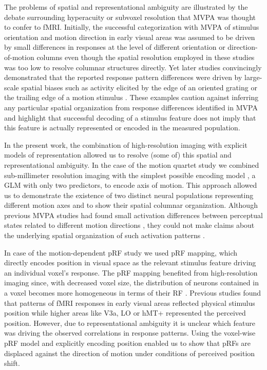 The problems of spatial and representational ambiguity are illustrated by the debate surrounding hyperacuity or subvoxel resolution that MVPA was thought to confer to fMRI. Initially, the successful categorization with MVPA of stimulus orientation \parencite{Haynes2005, Kamitani2005} and motion direction \parencite{Kamitani2006} in early visual areas was assumed to be driven by small differences in responses at the level of different orientation or direction-of-motion columns even though the spatial resolution employed in these studies was too low to resolve columnar structures directly. Yet later studies convincingly demonstrated that the reported response pattern differences were driven by large-scale spatial biases such as activity elicited by the edge of an oriented grating \parencite{Freeman2011, Carlson2014, Roth2018} or the trailing edge of a motion stimulus \parencite{Wang2014}. These examples caution against inferring any particular spatial organization from response differences identified in MVPA and highlight that successful decoding of a stimulus feature does not imply that this feature is actually represented or encoded in the measured population.

In the present work, the combination of high-resolution imaging with explicit models of representation \parencite{Naselaris2015a} allowed us to resolve (some of) this spatial and representational ambiguity. In the case of the motion quartet study we combined sub-millimeter resolution imaging with the simplest possible encoding model \parencite{Naselaris2011}, a GLM with only two predictors, to encode axis of motion. This approach allowed us to demonstrate the existence of two distinct neural populations representing different motion axes and to show their spatial columnar organization. Although previous MVPA studies had found small activation differences between perceptual states related to different motion directions \parencite{Kamitani2006, Brouwer2007}, they could not make claims about the underlying spatial organization of such activation patterns \parencite{Logothetis2008, Bartels2008}.

In case of the motion-dependent pRF study we used pRF mapping, which directly encodes position in visual space as the relevant stimulus feature driving an individual voxel's response. The pRF mapping benefited from high-resolution imaging since, with decreased voxel size, the distribution of neurons contained in a voxel becomes more homogeneous in terms of their RF \parencite{DeMartino2016}. Previous studies \parencite{Fischer2011, Maus2013} found that patterns of fMRI responses in early visual areas reflected physical stimulus position while higher areas like V3a, LO or hMT+ represented the perceived position. However, due to representational ambiguity it is unclear which feature was driving the observed correlations in response patterns. Using the voxel-wise pRF model and explicitly encoding position enabled us to show that pRFs are displaced against the direction of motion under conditions of perceived position shift.

